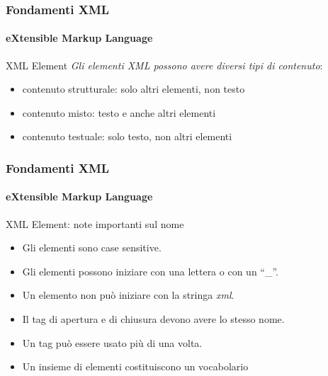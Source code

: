 \begin{frame}
    \frametitle{Fondamenti XML}
    \framesubtitle{eXtensible Markup Language}
    \addtocounter{nframe}{1}

	\begin{block}{XML Element}
		\textit{Gli elementi XML possono avere diversi tipi di contenuto}:
		\begin{itemize}
			\item contenuto strutturale: solo altri elementi, non testo
			\item contenuto misto: testo e anche altri elementi
			\item contenuto testuale: solo testo, non altri elementi
		\end{itemize}
	\end{block}
	
\end{frame}

\begin{frame}
    \frametitle{Fondamenti XML}
    \framesubtitle{eXtensible Markup Language}
    \addtocounter{nframe}{1}

	\begin{block}{XML Element: note importanti sul nome}
		\begin{itemize}
			\item Gli elementi sono case sensitive.
			\item Gli elementi possono iniziare con una lettera o con un ``\_''.
			\item Un elemento non può iniziare con la stringa \textit{xml}. 
			\item Il tag di apertura e di chiusura devono avere lo stesso nome.
			\item Un tag può essere usato più di una volta.
			\item Un insieme di elementi costituiscono un vocabolario
		\end{itemize}
	\end{block}
\end{frame}





